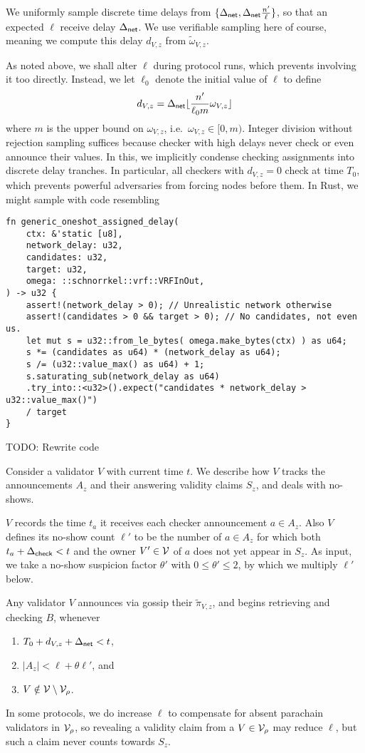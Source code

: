 We uniformly sample discrete time delays from $\{ \Delta_{\mathsf{net}}, \Delta_{\mathsf{net}} {n' \over \ell} \}$, so that an expected $\ell$ receive delay $\Delta_{\mathsf{net}}$.  We use verifiable sampling here of course, meaning we compute this delay $d_{V,z}$ from $\tilde{\omega}_{V,z}$.  

As noted above, we shall alter $\ell$ during protocol runs, which prevents involving it too directly.  Instead, we let $\ell_0$ denote the initial value of $\ell$ to define 
$$ d_{V,z} = \Delta_{\mathsf{net}} \lfloor {n' \over \ell_0 m} \omega_{V,z} \rfloor $$
where $m$ is the upper bound on $\omega_{V,z}$, i.e.\ $\omega_{V,z} \in [0,m)$.  Integer division without rejection sampling suffices because checker with high delays never check or even announce their values.
%
In this, we implicitly condense checking assignments into discrete delay tranches.  In particular, all checkers with $d_{V,z} = 0$ check at time $T_0$, which prevents powerful adversaries from forcing nodes before them. 
%
In Rust, we might sample with code resembling
\begin{verbatim}
fn generic_oneshot_assigned_delay(
    ctx: &'static [u8],
    network_delay: u32, 
    candidates: u32,
    target: u32,
    omega: ::schnorrkel::vrf::VRFInOut,
) -> u32 {
    assert!(network_delay > 0); // Unrealistic network otherwise
    assert!(candidates > 0 && target > 0); // No candidates, not even us.
    let mut s = u32::from_le_bytes( omega.make_bytes(ctx) ) as u64;
    s *= (candidates as u64) * (network_delay as u64);
    s /= (u32::value_max() as u64) + 1;
    s.saturating_sub(network_delay as u64)
    .try_into::<u32>().expect("candidates * network_delay > u32::value_max()")
    / target
}
\end{verbatim}
TODO: Rewrite code

Consider a validator $V$ with current time $t$.  We describe how $V$ tracks the announcements $A_z$ and their answering validity claims $S_z$, and deals with no-shows.

$V$ records the time $t_a$ it receives each checker announcement $a \in A_z$.  Also $V$ defines its no-show count $\ell'$ to be the number of $a \in A_z$ for which both $t_a + \Delta_{\mathsf{check}} < t$ and the owner $V'\in \mathcal{V}$ of $a$ does not yet appear in $S_z$.  As input, we take a no-show suspicion factor $\theta'$ with $0 \le \theta' \le 2$, by which we multiply $\ell'$ below.

Any validator $V$ announces via gossip their $\tilde{\pi}_{V,z}$, and begins retrieving and checking $B$, whenever
\begin{enumerate}
\item $T_0 + d_{V,z} + \Delta_{\mathsf{net}} < t$,
\item $|A_z| < \ell + \theta \ell'$, and
\item $V \notin \mathcal{V} \setminus \mathcal{V}_\rho$.
\end{enumerate}
In some protocols, we do increase $\ell$ to compensate for absent parachain validators in $\mathcal{V}_\rho$, so revealing a validity claim from a $V \in \mathcal{V}_\rho$ may reduce $\ell$, but such a claim never counts towards $S_z$.

